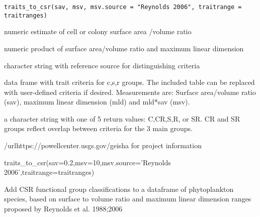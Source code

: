 \documentclass[a4paper]{book}
\begin{document}
%
\begin{Usage}
\begin{verbatim}
traits_to_csr(sav, msv, msv.source = "Reynolds 2006", traitrange = traitranges)
\end{verbatim}
\end{Usage}
%
\begin{Arguments}
\begin{ldescription}
\item[\code{sav}] numeric estimate of cell or colony surface area /volume ratio

\item[\code{msv}] numeric product of surface area/volume ratio and maximum linear dimension

\item[\code{msv.source}] character string with reference source for distinguishing criteria

\item[\code{traitrange}] data frame with trait criteria for c,s,r groups. The included table
can be replaced with user-defined criteria if desired. Measurements are:
Surface area/volume ratio (sav), maximum linear dimension (mld) and mld*sav (msv).
\end{ldescription}
\end{Arguments}
%
\begin{Value}
a character string with one of 5 return values: C,CR,S,R, or SR.
CR and SR groups reflect overlap between criteria for the 3 main groups.
\end{Value}
%
\begin{SeeAlso}\relax
/urlhttps://powellcenter.usgs.gov/geisha for project information
\end{SeeAlso}
%
\begin{Examples}
\begin{ExampleCode}

traits_to_csr(sav=0.2,msv=10,msv.source='Reynolds 2006',traitrange=traitranges)


\end{ExampleCode}
\end{Examples}
%
\begin{Description}\relax
Add CSR functional group classifications to a dataframe of phytoplankton species, based on surface to volume ratio and
maximum linear dimension ranges proposed by Reynolds et al. 1988;2006
\end{Description}
\end{document}
